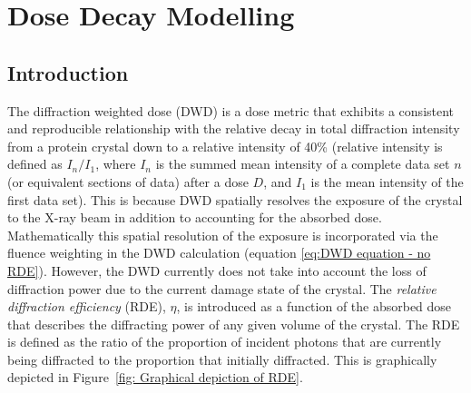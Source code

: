 \chapter{Dose Decay Modelling}
\label{chap:Dose Decay Modelling}

\section{Introduction}
\label{sec:Introduction - Dose Decay Modelling}

The diffraction weighted dose (DWD) is a dose metric that exhibits a consistent and reproducible relationship with the relative decay in total diffraction intensity from a protein crystal down to a relative intensity of 40\% \cite{zeldin2013dwd} (relative intensity is defined as $I_n/I_1$, where $I_n$ is the summed mean intensity of a complete data set $n$ (or equivalent sections of data) after a dose $D$, and $I_1$ is the mean intensity of the first data set).
This is because DWD spatially resolves the exposure of the crystal to the X-ray beam in addition to accounting for the absorbed dose.
Mathematically this spatial resolution of the exposure is incorporated via the fluence weighting in the DWD calculation (equation \ref{eq:DWD equation - no RDE}).
However, the DWD currently does not take into account the loss of diffraction power due to the current damage state of the crystal.
The \textit{relative diffraction efficiency} (RDE), $\eta$, is introduced as a function of the absorbed dose that describes the diffracting power of any given volume of the crystal.
The RDE is defined as the ratio of the proportion of incident photons that are currently being diffracted to the proportion that initially diffracted.
This is graphically depicted in Figure~\ref{fig: Graphical depiction of RDE}.
